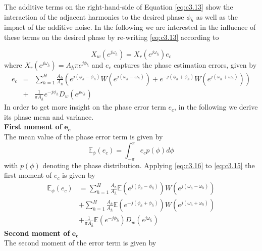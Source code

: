 The additive terms on the right-hand-side of Equation \eqref{eq:c3.13} show the interaction of the adjacent harmonics to the desired phase $\phi_{\bar{h}}$ as well as the impact of the additive noise. In the following we are interested in the influence of these terms on the desired phase by re-writing \eqref{eq:c3.13} according to

\begin{equation}\label{eq:c3.14}
X_w(e^{j\omega_{\bar{h}}})=X_r(e^{j\omega_{\bar{h}}})e_c
\end{equation}
where $X_r(e^{j\omega_{\bar{h}}})=A_{\bar{h}}\pi e^{j\phi_{\bar{h}}}$ and $e_c$ captures the phase estimation errors, given by
\begin{eqnarray}\label{eq:c3.15}
e_c&=&\sum_{h=1}^H\frac{A_h}{A_{\bar{h}}}\left( e^{j(\phi_h-\phi_{\bar{h}})}W(e^{j(\omega_{\bar{h}}-\omega_h)})+ e^{-j(\phi_h+\phi_{\bar{h}})}W(e^{j(\omega_{\bar{h}}+\omega_h)}) \right)\nonumber\\
&+& \frac{1}{\pi A_{\bar{h}}}e^{-j\phi_{\bar{h}}}D_w(e^{j\omega_{\bar{h}}})
\end{eqnarray}
In order to get more insight on the phase error term $e_c$, in the following we derive its phase mean and variance.\\
\textbf{First moment of }$\boldsymbol{e_c}$~\\
\noindent The mean value of the phase error term is given by
\begin{equation}\label{eq:c3.16}
\mathbb{E}_\phi(e_c)=\int_{-\pi}^\pi e_c p(\phi)d\phi
\end{equation}
with $p(\phi)$ denoting the phase distribution. Applying \eqref{eq:c3.16} to \eqref{eq:c3.15} the first moment of $e_c$ is given by
\begin{equation}\label{eq:c3.17}
\begin{split}
\mathbb{E}_\phi(e_c) &= \sum_{h=1}^H\frac{A_h}{A_{\bar{h}}} \mathbb{E}(e^{j(\phi_h-\phi_{\bar{h}})})W(e^{j(\omega_{\bar{h}}-\omega_h)})\\
&+ \sum_{h=1}^H\frac{A_h}{A_{\bar{h}}} \mathbb{E}(e^{-j(\phi_h+\phi_{\bar{h}})})W(e^{j(\omega_{\bar{h}}+\omega_h)})\\
&+ \frac{1}{\pi A_{\bar{h}}}\mathbb{E}(e^{-j\phi_{\bar{h}}})D_w(e^{j\omega_{\bar{h}}})
\end{split}
\end{equation}
\textbf{Second moment of }$\boldsymbol{e_c}$~\\
\noindent {}The second moment of the error term is given by
